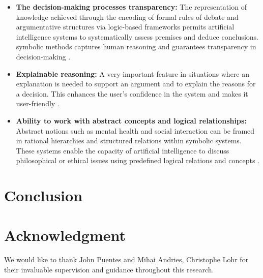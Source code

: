 \documentclass[conference]{IEEEtran}
\begin{document}
\begin{itemize}
    \item \textbf{The decision-making processes transparency:} The representation of knowledge achieved through the encoding of formal rules of debate and argumentative structures via logic-based frameworks permits artificial intelligence systems to systematically assess premises and deduce conclusions. symbolic methods captures human reasoning and guarantees transparency in decision-making \cite{b8}.
    \item \textbf{Explainable reasoning:} A very important feature in situations where an explanation is needed to support an argument and to explain the reasons for a decision. This enhances the user's confidence in the system and makes it user-friendly \cite{b9}.
    \item \textbf{Ability to work with abstract concepts and logical relationships:} Abstract notions such as mental health and social interaction can be framed in rational hierarchies and structured relations within symbolic systems. These systems enable the capacity of artificial intelligence to discuss philosophical or ethical issues using predefined logical relations and concepts \cite{b8}.
\end{itemize}

\section{Conclusion}

\section*{Acknowledgment}
We would like to thank John Puentes and Mihai Andries, Christophe Lohr for their invaluable supervision and guidance throughout this research.
\end{document}
